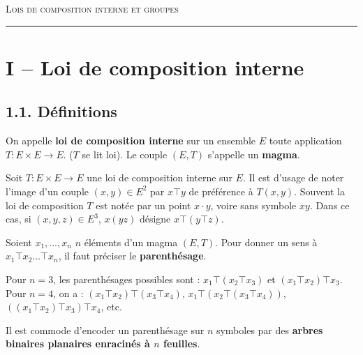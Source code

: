 \documentclass[a4paper,11pt]{article}
\newcommand{\mot}[1]{\textcolor{bordeaux}{\textbf{#1}}}
\begin{document}
\begin{center}
  {\LARGE\scshape\color{bordeaux} Lois de composition interne et groupes }\\[2pt]
  {\color{brun}\rule{0.45\linewidth}{0.8pt}}
\end{center}

\section{I -- Loi de composition interne}

\subsection{1.1. Définitions}

\begin{definition}
On appelle \mot{loi de composition interne} sur un ensemble $E$ toute application $T : E \times E \to E$. ($T$ se lit loi). 
Le couple $(E, T)$ s'appelle un \mot{magma}.
\end{definition}

\begin{remarque}
Soit $T : E \times E \to E$ une loi de composition interne sur $E$. Il est d'usage de noter l'image d'un couple $(x,y) \in E^2$ par $x \top y$ de préférence à $T(x,y)$. 
Souvent la loi de composition $T$ est notée par un point $x \cdot y$, voire sans symbole $xy$.
Dans ce cas, si $(x,y,z) \in E^3$, $x(yz)$ désigne $x \top (y \top z)$.
\end{remarque}

\begin{definition}
Soient $x_1, \dots, x_n$ $n$ éléments d'un magma $(E, T)$. Pour donner un sens à $x_1 \top x_2 \dots \top x_n$, il faut préciser le \mot{parenthésage}.
\end{definition}

\begin{exemples}
Pour $n=3$, les parenthésages possibles sont : $x_1 \top (x_2 \top x_3)$ et $(x_1 \top x_2) \top x_3$.
Pour $n=4$, on a : $(x_1 \top x_2) \top (x_3 \top x_4)$, $x_1 \top (x_2 \top (x_3 \top x_4))$, $((x_1 \top x_2) \top x_3) \top x_4$, etc.
\end{exemples}

Il est commode d'encoder un parenthésage sur $n$ symboles par des \mot{arbres binaires planaires enracinés à $n$ feuilles}.
\end{document}
